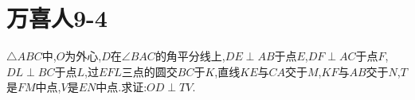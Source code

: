 \documentclass[]{article}
\title{}
\author{}
\date{}
\begin{document}
\maketitle
\section{万喜人9-4}{
$\triangle ABC$中,$O$为外心,$D$在$\angle BAC$的角平分线上,$DE\perp AB$于点$E$,$DF\perp AC$于点$F$,$DL\perp BC$于点$L$,过$EFL$三点的圆交$BC$于$K$,直线$KE$与$CA$交于$M$,$KF$与$AB$交于$N$,$T$是$FM$中点,$V$是$EN$中点.求证:$OD \perp TV$.

}
\end{document}
